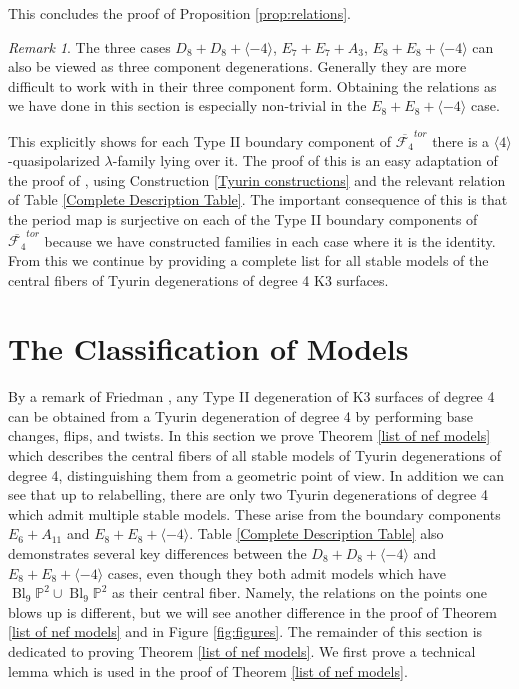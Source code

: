 \documentclass[a4paper]{amsart}
\theoremstyle{definition}
\theoremstyle{plain}
\theoremstyle{remark}
\newtheorem{rk}[defn]{Remark}
\newcommand{\PS}{\mathbb{P}}
\begin{document}
This concludes the proof of Proposition \ref{prop:relations}.

\begin{rk}
The three cases $D_8+D_8+\langle-4\rangle$, $E_7+E_7+A_3$, $E_8+E_8+\langle-4\rangle$  can also be viewed as three component degenerations. Generally they are more difficult to work with in their three component form. Obtaining the relations as we have done in this section is especially non-trivial in the $E_8+E_8+\langle-4\rangle$ case.
\end{rk}

This explicitly shows for each Type II boundary component of $\overline{\mathcal{F}_4}^{tor}$ there is a $\langle 4 \rangle$-quasipolarized $\lambda$-family lying over it. The proof of this is an easy adaptation of the proof of \cite[Theorem 7.23]{AE23}, using Construction \ref{Tyurin constructions} and the relevant relation of Table \ref{Complete Description Table}. The important consequence of this is that the period map is surjective on each of the Type II boundary components of $\overline{\mathcal{F}_4}^{tor}$ because we have constructed families in each case where it is the identity. From this we continue by providing a complete list for all stable models of the central fibers of Tyurin degenerations of degree 4 K3 surfaces.

\section{The Classification of Models}\label{sect:clasification of models}
By a remark of Friedman \cite[Remark 3.9]{Fried84}, any Type II degeneration of K3 surfaces of degree 4 can be obtained from a Tyurin degeneration of degree 4 by performing base changes, flips, and twists. In this section we prove Theorem \ref{list of nef models} which describes the central fibers of all stable models of Tyurin degenerations of degree 4, distinguishing them from a geometric point of view. In addition we can see that up to relabelling, there are only two Tyurin degenerations of degree 4 which admit multiple stable models. These arise from the boundary components $E_6+A_{11}$ and $E_8+E_8+\langle -4 \rangle$. Table \ref{Complete Description Table} also demonstrates several key differences between the $D_8+D_8+\langle -4 \rangle$ and $E_8+E_8+\langle -4 \rangle$ cases, even though they both admit models which have $\operatorname{Bl}_9\PS^2\cup\operatorname{Bl}_9\PS^2$ as their central fiber. Namely, the relations on the points one blows up is different, but we will see another difference in the proof of Theorem \ref{list of nef models} and in Figure \ref{fig:figures}. The remainder of this section is dedicated to proving Theorem \ref{list of nef models}. We first prove a technical lemma which is used in the proof of Theorem \ref{list of nef models}.
\end{document}
